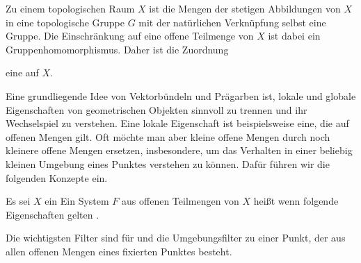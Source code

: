 Zu einem topologischen Raum $X$ ist die Mengen der stetigen Abbildungen von $X$ in eine topologische Gruppe $G$ mit der natürlichen Verknüpfung selbst eine Gruppe. Die Einschränkung auf eine offene Teilmenge von $X$ ist dabei ein Gruppenhomomorphismus. Daher ist die Zuordnung

 {  }

eine
auf $X$.






Eine grundliegende Idee von Vektorbündeln und Prägarben ist, lokale und globale Eigenschaften von geometrischen Objekten sinnvoll zu trennen und ihr Wechselspiel zu verstehen. Eine lokale Eigenschaft ist beispielsweise eine, die auf   offenen Mengen gilt. Oft möchte man aber kleine offene Mengen durch noch kleinere offene Mengen ersetzen, insbesondere, um das Verhalten in einer beliebig kleinen Umgebung eines Punktes verstehen zu können. Dafür führen wir die folgenden Konzepte ein.


{}
{





Es sei $X$ ein
Ein System $F$ aus offenen Teilmengen von $X$ heißt  wenn folgende Eigenschaften gelten
 {} {.}





}
Die wichtigsten Filter sind für und die Umgebungsfilter zu einer Punkt, der aus allen offenen Mengen eines fixierten Punktes besteht.


